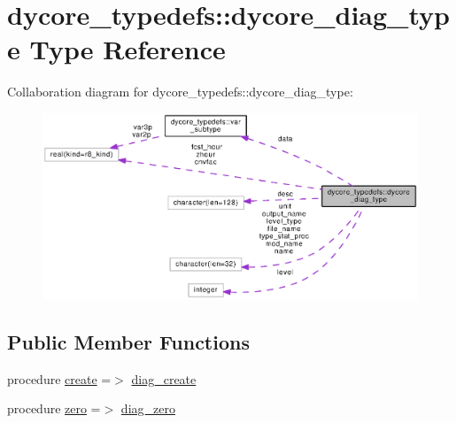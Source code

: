 \section{dycore\-\_\-typedefs\-:\-:dycore\-\_\-diag\-\_\-type Type Reference}
\label{structdycore__typedefs_1_1dycore__diag__type}


Collaboration diagram for dycore\-\_\-typedefs\-:\-:dycore\-\_\-diag\-\_\-type\-:
\nopagebreak
\begin{figure}[H]
\begin{center}
\leavevmode
\includegraphics[width=350pt]{structdycore__typedefs_1_1dycore__diag__type__coll__graph}
\end{center}
\end{figure}
\subsection*{Public Member Functions}
\begin{DoxyCompactItemize}
\item 
procedure \hyperlink{structdycore__typedefs_1_1dycore__diag__type_a0ff0f4a073adc31b5fc72237e43fd1b9}{create} =$>$ \hyperlink{classdycore__typedefs_a6a4ce247c95b0a8791caf9ce5c4f28b0}{diag\-\_\-create}
\item 
procedure \hyperlink{structdycore__typedefs_1_1dycore__diag__type_a90a9e69d10c0004ebce151318b8aab03}{zero} =$>$ \hyperlink{classdycore__typedefs_a9b0e3a5b8a1e2e40e721055f51c3a437}{diag\-\_\-zero}
\end{DoxyCompactItemize}
